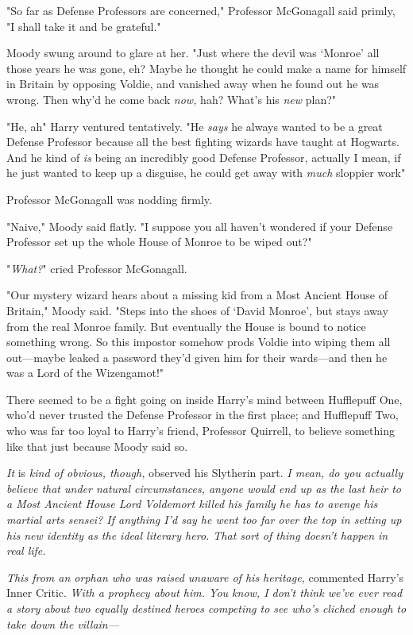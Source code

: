 "So far as Defense Professors are concerned," Professor McGonagall said primly,
"I shall take it and be grateful."

Moody swung around to glare at her. "Just where the devil was `Monroe' all
those years he was gone, eh? Maybe he thought he could make a name for himself
in Britain by opposing Voldie, and vanished away when he found out he was
wrong. Then why'd he come back \emph{now,} hah? What's his \emph{new} plan?"

"He, ah{\el}" Harry ventured tentatively. "He \emph{says} he always wanted
to be a great Defense Professor because all the best fighting wizards have
taught at Hogwarts. And he kind of \emph{is} being an incredibly good Defense
Professor, actually{\el} I mean, if he just wanted to keep up a disguise, he
could get away with \emph{much} sloppier work{\el}"

Professor McGonagall was nodding firmly.

"Naive," Moody said flatly. "I suppose you all haven't wondered if your Defense
Professor set up the whole House of Monroe to be wiped out?"

"\emph{What?}" cried Professor McGonagall.

"Our mystery wizard hears about a missing kid from a Most Ancient House of
Britain," Moody said. "Steps into the shoes of `David Monroe', but stays away
from the real Monroe family. But eventually the House is bound to notice
something wrong. So this impostor somehow prods Voldie into wiping them all
out---maybe leaked a password they'd given him for their wards---and then he
was a Lord of the Wizengamot!"

There seemed to be a fight going on inside Harry's mind between Hufflepuff One,
who'd never trusted the Defense Professor in the first place; and Hufflepuff
Two, who was far too loyal to Harry's friend, Professor Quirrell, to believe
something like that just because Moody said so.

\emph{It} is \emph{kind of obvious, though,} observed his Slytherin part.
\emph{I mean, do you actually believe that under natural circumstances, anyone
would end up as the last heir to a Most Ancient House  Lord Voldemort killed
his family  he has to avenge his martial arts sensei? If anything I'd say he
went too far over the top in setting up his new identity as the ideal literary
hero. That sort of thing doesn't happen in real life.}

\emph{This from an orphan who was raised unaware of his heritage,} commented
Harry's Inner Critic. \emph{With a prophecy about him. You know, I don't think
we've ever read a story about two equally destined heroes competing to see
who's cliched enough to take down the villain---}

